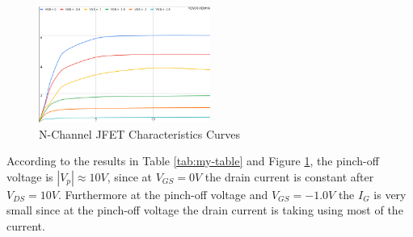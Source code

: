 \documentclass[12pt]{article}
\begin{document}
\begin{figure}[H] %
    \centering
    \includegraphics[width=0.5\textwidth]{assets/chart (17).png}
    \caption{N-Channel JFET Characteristics Curves}
    \label{fig:my-figure}
\end{figure}
According to the results in Table \ref{tab:my-table} and Figure \ref{fig:my-figure}, the pinch-off voltage is $|V_p|\approx 10V$, since at $V_{GS} = 0V$ the drain current is constant after $V_{DS} = 10V$. Furthermore at the pinch-off voltage and $V_{GS} = -1.0V$ the $I_G$ is very small since at the pinch-off voltage the drain current is taking using most of the current. 
\end{document}
